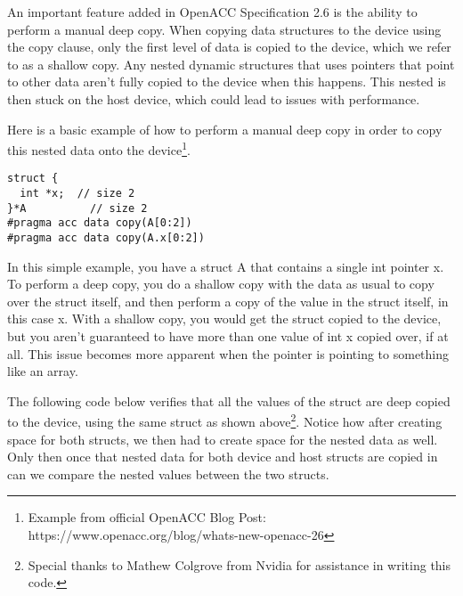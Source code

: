 An important feature added in OpenACC Specification 2.6 is the ability to perform a manual deep copy. When copying data structures to the device using the copy clause, only the first level of data is copied to the device, which we refer to as a shallow copy. Any nested dynamic structures that uses pointers that point to other data aren't fully copied to the device when this happens. This nested is then stuck on the host device, which could lead to issues with performance. 

Here is a basic example of how to perform a manual deep copy in order to copy this nested data onto the device\footnote{Example from official OpenACC Blog Post: https://www.openacc.org/blog/whats-new-openacc-26}. 

\begin{Code}
\begin{lstlisting}[frame=single, caption=basicdeepcopy.c, label=prototype, numbers=none]
struct {
  int *x;  // size 2
}*A          // size 2
#pragma acc data copy(A[0:2])
#pragma acc data copy(A.x[0:2])
\end{lstlisting}
\end{Code}

In this simple example, you have a struct A that contains a single int pointer x. To perform a deep copy, you do a shallow copy with the data as usual to copy over the struct itself, and then perform a copy of the value in the struct itself, in this case x. With a shallow copy, you would get the struct copied to the device, but you aren't guaranteed to have more than one value of int x copied over, if at all. This issue becomes more apparent when the pointer is pointing to something like an array.

The following code below verifies that all the values of the struct are deep copied to the device, using the same struct as shown above\footnote{Special thanks to Mathew Colgrove from Nvidia for assistance in writing this code.}. Notice how after creating space for both structs, we then had to create space for the nested data as well. Only then once that nested data for both device and host structs are copied in can we compare the nested values between the two structs.

